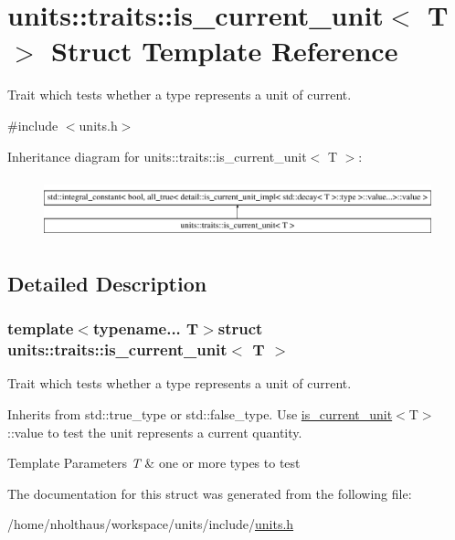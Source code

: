 \hypertarget{structunits_1_1traits_1_1is__current__unit}{}\section{units\+:\+:traits\+:\+:is\+\_\+current\+\_\+unit$<$ T $>$ Struct Template Reference}
\label{structunits_1_1traits_1_1is__current__unit}


Trait which tests whether a type represents a unit of current.  




{\ttfamily \#include $<$units.\+h$>$}

Inheritance diagram for units\+:\+:traits\+:\+:is\+\_\+current\+\_\+unit$<$ T $>$\+:\begin{figure}[H]
\begin{center}
\leavevmode
\includegraphics[height=1.769352cm]{structunits_1_1traits_1_1is__current__unit}
\end{center}
\end{figure}


\subsection{Detailed Description}
\subsubsection*{template$<$typename... T$>$struct units\+::traits\+::is\+\_\+current\+\_\+unit$<$ T $>$}

Trait which tests whether a type represents a unit of current. 

Inherits from {\ttfamily std\+::true\+\_\+type} or {\ttfamily std\+::false\+\_\+type}. Use {\ttfamily \hyperlink{structunits_1_1traits_1_1is__current__unit}{is\+\_\+current\+\_\+unit}$<$T$>$\+::value} to test the unit represents a current quantity. 
\begin{DoxyTemplParams}{Template Parameters}
{\em T} & one or more types to test \\
\hline
\end{DoxyTemplParams}


The documentation for this struct was generated from the following file\+:\begin{DoxyCompactItemize}
\item 
/home/nholthaus/workspace/units/include/\hyperlink{units_8h}{units.\+h}\end{DoxyCompactItemize}
